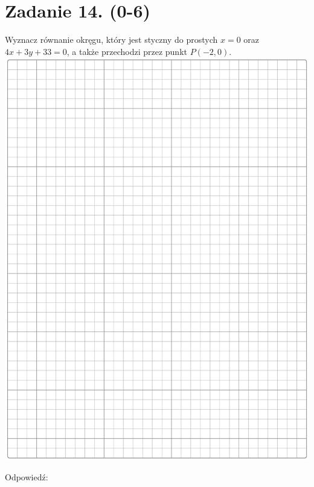 \documentclass[10pt]{article}
\begin{document}
\section*{Zadanie 14. (0-6)}
Wyznacz równanie okręgu, który jest styczny do prostych \(x=0\) oraz \(4 x+3 y+33=0\), a także przechodzi przez punkt \(P(-2,0)\).\\
\includegraphics[max width=\textwidth, center]{2024_11_21_599d917d55a506aace4bg-09}

Odpowiedź: \(\qquad\)
\end{document}
